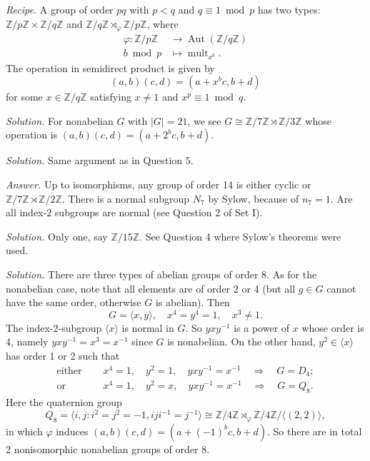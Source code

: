 \documentclass{mathproblems}
\newcommand\Z{\mathbb{Z}}
\begin{document}
\begin{questions}
{\color{violet}
\textit{Recipe.} A group of order $p q$ with $p<q$ and $q\equiv 1 \bmod p$ has two types: $\Z/p\Z \times \Z/q\Z$ and $\Z/q\Z\rtimes_{\varphi} \Z/p\Z$, where
$$
\begin{aligned}
\varphi: \Z/p\Z &\longrightarrow \operatorname{Aut}(\Z/q\Z)\\
b \bmod p & \longmapsto \operatorname{mult}_{x^b}.
\end{aligned}
$$
The operation in semidirect product is given by
$$
(a,b)(c,d)=(a+x^b c, b+d)
$$
for some $x\in \Z/q\Z$ satisfying $x\neq 1$ and $x^p\equiv 1\bmod q$.}

\textit{Solution.} 
For nonabelian $G$ with $|G|=21$, we see $G\cong\Z/7\Z\rtimes \Z/3\Z$ whose operation is $(a,b)(c,d)=(a+2^b c,b+d)$.


\textit{Solution.}
Same argument as in Question 5.


\textit{Answer.}
Up to isomorphisms, any group of order 14 is either cyclic or $\Z/7\Z\rtimes \Z/2\Z$. There is a normal subgroup $N_7$ by Sylow, because of $n_7=1$. Are all index-$2$ subgroups are normal (see Question 2 of Set I).


\textit{Solution.}
Only one, say $\Z/15\Z$. See Question 4 where Sylow's theorems were used.


\textit{Solution.}
There are three types of abelian groups of order 8. As for the nonabelian case, note that all elements are of order 2 or 4 (but all $g\in G$ cannot have the same order, otherwise $G$ is abelian). Then
$$
G=\langle x,y \rangle,\quad x^4=y^4=1, \quad x^3\neq 1.
$$
The index-2-subgroup $\langle x \rangle$ is normal in $G$. So $y x y^{-1}$ is a power of $x$ whose order is 4, namely $y x y^{-1}=x^3=x^{-1}$ since $G$ is nonabelian. On the other hand, $y^2\in \langle x\rangle$ has order 1 or 2 such that
$$
\begin{aligned}
\text{either }\quad & x^4=1,\quad y^2=1,\quad y x y^{-1}=x^{-1} \quad \Longrightarrow \quad G=D_4;\\
\text{or }\quad & x^4=1,\quad y^2=x,\quad y x y^{-1}=x^{-1} \quad \Longrightarrow \quad G=Q_8.
\end{aligned}
$$
Here the quaternion group
$$
Q_8=\langle i,j: i^2=j^2=-1, i j i^{-1}=j^{-1} \rangle \cong \Z/4\Z \rtimes_{\varphi} \Z/4\Z / \langle (2,2) \rangle,
$$
in which $\varphi$ induces $(a,b)(c,d)=(a+(-1)^b c,b+d)$. So there are in total 2 nonisomorphic nonabelian groups of order 8.


\end{questions}
\end{document}
